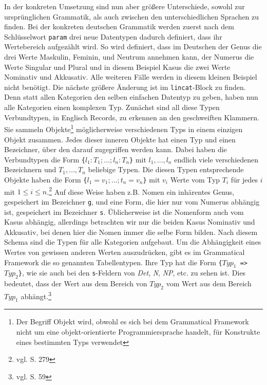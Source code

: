 In der konkreten Umsetzung sind nun aber größere Unterschiede, sowohl zur ursprünglichen Grammatik, als auch zwischen den unterschiedlichen Sprachen zu finden. Bei der konkreten deutschen Grammatik werden zuerst nach dem Schlüsselwort \texttt{param} drei neue Datentypen dadurch definiert, dass ihr Wertebereich aufgezählt wird. So wird definiert, dass im Deutschen der Genus die drei Werte Maskulin, Feminin, und Neutrum annehmen kann, der Numerus die Werte Singular und Plural und in diesem Beispiel Kasus die zwei Werte Nominativ und Akkusativ. Alle weiteren Fälle werden in diesem kleinen Beispiel nicht benötigt. Die nächste größere Änderung ist im \texttt{lincat}-Block zu finden. Denn statt allen Kategorien den selben einfachen Datentyp zu geben, haben nun alle Kategorien einen komplexen Typ. Zunächst sind all diese Typen Verbundtypen, in Englisch Records, zu erkennen an den geschweiften Klammern. Sie sammeln Objekte\footnote{Der Begriff Objekt wird, obwohl es sich bei dem Grammatical Framework nicht um eine objekt-orientierte Programmiersprache handelt, für Konstrukte eines bestimmten Typs verwendet} möglicherweise verschiedenen Typs in einem einzigen Objekt zusammen. Jedes dieser inneren Objekte hat einen Typ und einen Bezeichner, über den darauf zugegriffen werden kann. Dabei haben die Verbundtypen die Form \texttt{\{$l_1 : T_1 ; \dots ; l_n : T_n$\}} mit $l_1, \dots, l_n$ endlich viele verschiedenen Bezeichnern und $T_1, \dots, T_n$ beliebige Typen. Die diesen Typen entsprechende Objekte haben die Form \texttt{\{$l_1 = v_1 ; \dots ; t_n = v_n$\}} mit $v_i$ Werte vom Typ $T_i$ für jedes $i$ mit $1\leq i\leq n$.\footnote{vgl. \cite{RANTA2011} S. 279} Auf diese Weise haben z.B. Nomen ein inhärentes Genus, gespeichert im Bezeichner \texttt{g}, und eine Form, die hier nur vom Numerus abhängig ist, gespeichert im Bezeichner \texttt{s}. Üblicherweise ist die Nomenform auch vom Kasus abhängig, allerdings betrachten wir nur die beiden Kasus Nominativ und Akkusativ, bei denen hier die Nomen immer die selbe Form bilden. Nach diesem Schema sind die Typen für alle Kategorien aufgebaut. Um die Abhängigkeit eines Wertes von gewissen anderen Werten auszudrücken, gibt es im Grammatical Framework die so genannten Tabellentypen. Ihre Typ hat die Form \texttt{\{$Typ_1$ => $Typ_2$\}}, wie sie auch bei den \texttt{s}-Feldern von \textit{Det}, \textit{N}, \textit{NP}, etc. zu sehen ist. Dies bedeutet, dass der Wert aus dem Bereich von $Typ_2$ vom Wert aus dem Bereich $Typ_1$ abhängt.\footnote{vgl. \cite{RANTA2011} S. 59} \par
